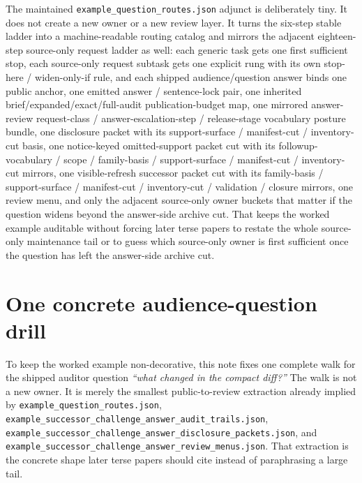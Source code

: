 \documentclass[11pt]{article}
\begin{document}
The maintained \texttt{example\_question\_routes.json} adjunct is deliberately tiny. It does not create a new owner or a new review layer. It turns the six-step stable ladder into a machine-readable routing catalog and mirrors the adjacent eighteen-step source-only request ladder as well: each generic task gets one first sufficient stop, each source-only request subtask gets one explicit rung with its own stop-here / widen-only-if rule, and each shipped audience/question answer binds one public anchor, one emitted answer / sentence-lock pair, one inherited brief/expanded/exact/full-audit publication-budget map, one mirrored answer-review request-class / answer-escalation-step / release-stage vocabulary posture bundle, one disclosure packet with its support-surface / manifest-cut / inventory-cut basis, one notice-keyed omitted-support packet cut with its followup-vocabulary / scope / family-basis / support-surface / manifest-cut / inventory-cut mirrors, one visible-refresh successor packet cut with its family-basis / support-surface / manifest-cut / inventory-cut / validation / closure mirrors, one review menu, and only the adjacent source-only owner buckets that matter if the question widens beyond the answer-side archive cut. That keeps the worked example auditable without forcing later terse papers to restate the whole source-only maintenance tail or to guess which source-only owner is first sufficient once the question has left the answer-side archive cut.

\section{One concrete audience-question drill}
\label{sec:drill}
To keep the worked example non-decorative, this note fixes one complete walk for the shipped auditor question \emph{``what changed in the compact diff?''}
The walk is not a new owner.
It is merely the smallest public-to-review extraction already implied by \texttt{example\_question\_routes.json}, \texttt{example\_successor\_challenge\_answer\_audit\_trails.json}, \texttt{example\_successor\_challenge\_answer\_disclosure\_packets.json}, and \texttt{example\_successor\_challenge\_answer\_review\_menus.json}.
That extraction is the concrete shape later terse papers should cite instead of paraphrasing a large tail.
\end{document}
